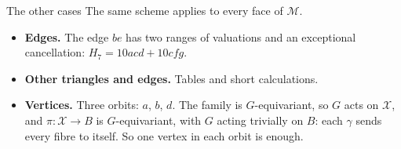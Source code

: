 \begin{frame}{The other cases}
The same scheme applies to every face of \(\mathcal M\).
\begin{itemize}
\setlength{\itemsep}{12pt}
\item \textbf{Edges.} The edge \(be\) has two ranges of valuations and an exceptional cancellation: \(H_7=10acd+10cfg\).
\item \textbf{Other triangles and edges.} Tables and short calculations.
\item \textbf{Vertices.} Three orbits: \(a\), \(b\), \(d\). The family is \(G\)-equivariant, so \(G\) acts on \(\mathcal X\), and \(\pi\colon\mathcal X\to B\) is \(G\)-equivariant, with \(G\) acting trivially on \(B\): each \(\gamma\) sends every fibre to itself. So one vertex in each orbit is enough.
\end{itemize}
\end{frame}


